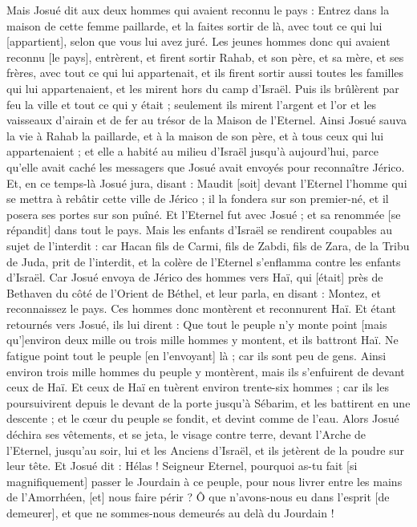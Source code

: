 \begin{multicols}{2}
Mais Josué dit aux deux hommes qui avaient reconnu le pays : Entrez dans la maison de cette femme paillarde, et la faites sortir de là, avec tout ce qui lui [appartient], selon que vous lui avez juré.
Les jeunes hommes donc qui avaient reconnu [le pays], entrèrent, et firent sortir Rahab, et son père, et sa mère, et ses frères, avec tout ce qui lui appartenait, et ils firent sortir aussi toutes les familles qui lui appartenaient, et les mirent hors du camp d'Israël.
Puis ils brûlèrent par feu la ville et tout ce qui y était ; seulement ils mirent l'argent et l'or et les vaisseaux d'airain et de fer au trésor de la Maison de l'Eternel.
Ainsi Josué sauva la vie à Rahab la paillarde, et à la maison de son père, et à tous ceux qui lui appartenaient ; et elle a habité au milieu d'Israël jusqu'à aujourd'hui, parce qu'elle avait caché les messagers que Josué avait envoyés pour reconnaître Jérico.
Et, en ce temps-là Josué jura, disant : Maudit [soit] devant l'Eternel l'homme qui se mettra à rebâtir cette ville de Jérico ; il la fondera sur son premier-né, et il posera ses portes sur son puîné.
Et l'Eternel fut avec Josué ; et sa renommée [se répandit] dans tout le pays.
\VerseOne{}Mais les enfants d'Israël se rendirent coupables au sujet de l'interdit : car Hacan fils de Carmi, fils de Zabdi, fils de Zara, de la Tribu de Juda, prit de l'interdit, et la colère de l'Eternel s'enflamma contre les enfants d'Israël.
Car Josué envoya de Jérico des hommes vers Haï, qui [était] près de Bethaven du côté de l'Orient de Béthel, et leur parla, en disant : Montez, et reconnaissez le pays. Ces hommes donc montèrent et reconnurent Haï.
Et étant retournés vers Josué, ils lui dirent : Que tout le peuple n'y monte point [mais qu']environ deux mille ou trois mille hommes y montent, et ils battront Haï. Ne fatigue point tout le peuple [en l'envoyant] là ; car ils sont peu de gens.
Ainsi environ trois mille hommes du peuple y montèrent, mais ils s'enfuirent de devant ceux de Haï.
Et ceux de Haï en tuèrent environ trente-six hommes ; car ils les poursuivirent depuis le devant de la porte jusqu'à Sébarim, et les battirent en une descente ; et le cœur du peuple se fondit, et devint comme de l'eau.
Alors Josué déchira ses vêtements, et se jeta, le visage contre terre, devant l'Arche de l'Eternel, jusqu'au soir, lui et les Anciens d'Israël, et ils jetèrent de la poudre sur leur tête.
Et Josué dit : Hélas ! Seigneur Eternel, pourquoi as-tu fait [si magnifiquement] passer le Jourdain à ce peuple, pour nous livrer entre les mains de l'Amorrhéen, [et] nous faire périr ? Ô que n'avons-nous eu dans l'esprit [de demeurer], et que ne sommes-nous demeurés au delà du Jourdain !

\end{multicols}
